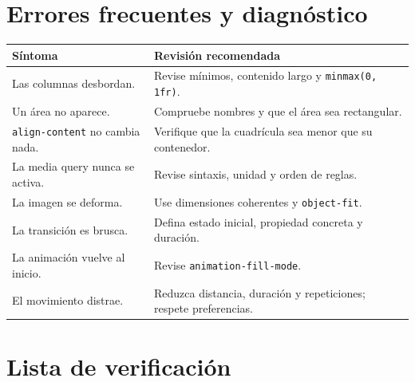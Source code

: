 \documentclass[11pt]{article}
\begin{document}
\section{Errores frecuentes y diagnóstico}

\begin{tabularx}{\linewidth}{X X}
\toprule
Síntoma & Revisión recomendada \\
\midrule
Las columnas desbordan. & Revise mínimos, contenido largo y \texttt{minmax(0, 1fr)}. \\
Un área no aparece. & Compruebe nombres y que el área sea rectangular. \\
\texttt{align-content} no cambia nada. & Verifique que la cuadrícula sea menor que su contenedor. \\
La media query nunca se activa. & Revise sintaxis, unidad y orden de reglas. \\
La imagen se deforma. & Use dimensiones coherentes y \texttt{object-fit}. \\
La transición es brusca. & Defina estado inicial, propiedad concreta y duración. \\
La animación vuelve al inicio. & Revise \texttt{animation-fill-mode}. \\
El movimiento distrae. & Reduzca distancia, duración y repeticiones; respete preferencias. \\
\bottomrule
\end{tabularx}

\section{Lista de verificación}

\begin{itemize}
\end{itemize}
\end{document}
